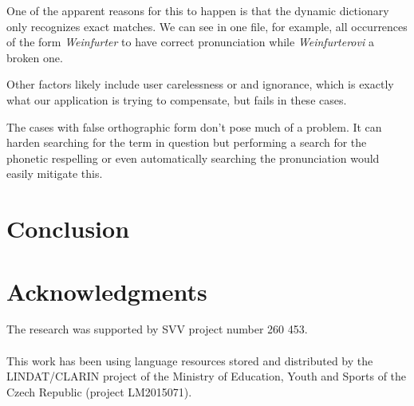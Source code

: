\documentclass{itatnew}
\begin{document}
One of the apparent reasons for this to happen is that the dynamic dictionary
only recognizes exact matches. We can see in one file, for example, all
occurrences of the form {\em Weinfurter} to have correct pronunciation while
{\em Weinfurterovi} a broken one.

Other factors likely include user carelessness or and ignorance, which is
exactly what our application is trying to compensate, but fails in these cases.

The cases with false orthographic form don't pose much of a problem. It can
harden searching for the term in question but performing a search for the
phonetic respelling or even automatically searching the pronunciation would
easily mitigate this.

\section{Conclusion}



\section*{Acknowledgments}

The research was supported by SVV project number 260 453.\\
\\
This work has been using language resources stored
and distributed  by the LINDAT/CLARIN project of the Ministry of Education,
Youth and Sports of the Czech Republic (project LM2015071).
\end{document}
